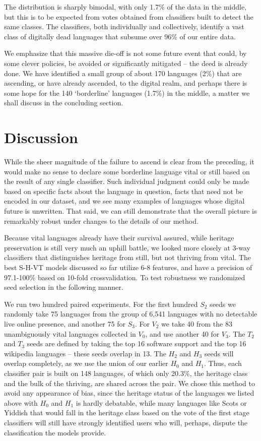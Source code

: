 \documentclass[10pt]{article}
\begin{document}
\medskip\noindent The distribution is sharply bimodal, with only 1.7\% of the
data in the middle, but this is to be expected from votes obtained from
classifiers built to detect the same classes. The classifiers, both
individually and collectively, identify a vast class of digitally dead
languages that subsume over 96\% of our entire data. 

We emphasize that this massive die-off is not some future event that could, by
some clever policies, be avoided or significantly mitigated -- the deed is
already done. We have identified a small group of about 170 languages (2\%)
that are ascending, or have already ascended, to the digital realm,
and perhaps there is some hope for the 140 `borderline' languages (1.7\%) in
the middle, a matter we shall discuss in the concluding section. 

\section*{Discussion}

While the sheer magnitude of the failure to ascend is clear from the preceding, it
would make no sense to declare some borderline language vital or {\color{black} still}
based on the result of any single classifier. Such individual judgment could
only be made based on specific facts about the language in question, facts
that need not be encoded in our dataset, and we see many examples of languages
whose digital future is unwritten. That said, we can still demonstrate that
the overall picture is remarkably robust under changes to the details of our
method. 

Because vital languages already have their survival assured, while heritage
preservation is still very much an uphill battle, we looked more closely at
3-way classifiers that distinguishes heritage from still, but not thriving
from vital. The best S-H-VT models discussed so far utilize 6-8 features,
and have a precision of 97.1-100\% based on 10-fold crossvalidation. To test
robustness we randomized seed selection in the following manner.

We run two hundred paired experiments. For the first hundred $S_2$ seeds we
randomly take 75 languages from the group of 6,541 languages with no
detectable live online presence, and another 75 for $S_3.$ For $V_2$ we take
40 from the 83 unambiguously vital languages collected in $V_0$, and use
another 40 for $V_3$. The $T_2$ and $T_3$ seeds are defined by taking the top
16 software support and the top 16 wikipedia languages -- these seeds overlap
in 13. The $H_2$ and $H_3$ seeds will overlap completely, as we use the union
of our earlier $H_0$ and $H_1$. Thus, each classifier pair is built on 148
languages, of which only 20.3\%, the heritage class and the bulk of the
thriving, are shared across the pair. We chose this method to avoid any
appearance of bias, since the heritage status of the languages we listed above
with $H_0$ and $H_1$ is hardly debatable, while many languages like Scots or
Yiddish that would fall in the heritage class based on the vote of the first
stage classifiers will still have strongly identified users who will, perhaps,
dispute the classification the models provide.
\end{document}
